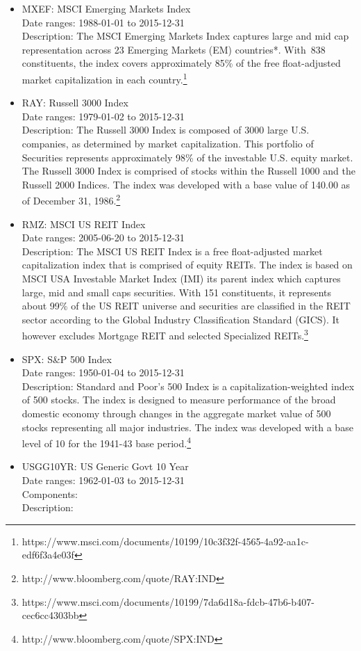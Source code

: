 \documentclass[12pt]{article}
\begin{document}
\begin{itemize}
Description: The MSCI EAFE Index is an equity index which captures large and mid cap representation across Developed Markets countries* around
the world, excluding the US and Canada. With 926 constituents, the index covers approximately 85\% of the free float-adjusted market
capitalization in each country.\footnote{https://www.msci.com/documents/10199/762896de-ebf3-49aa-89ec-e72c7592fd6b}
\item MXEF: MSCI Emerging Markets Index\\
Date ranges: 1988-01-01 to 2015-12-31 \\
Description: The MSCI Emerging Markets Index captures large and mid cap representation across 23 Emerging Markets (EM) countries*. With 838
constituents, the index covers approximately 85\% of the free float-adjusted market capitalization in each country.\footnote{https://www.msci.com/documents/10199/10c3f32f-4565-4a92-aa1c-edf6f3a4e03f}
\item RAY: Russell 3000 Index\\
Date ranges: 1979-01-02 to 2015-12-31 \\
Description: The Russell 3000 Index is composed of 3000 large U.S. companies, as determined by market capitalization. This portfolio of Securities represents approximately 98\% of the investable U.S. equity market. The Russell 3000 Index is comprised of stocks within the Russell 1000 and the Russell 2000 Indices. The index was developed with a base value of 140.00 as of December 31, 1986.\footnote{http://www.bloomberg.com/quote/RAY:IND}
\item RMZ: MSCI US REIT Index\\
Date ranges: 2005-06-20 to 2015-12-31 \\
Description: The MSCI US REIT Index is a free float-adjusted market capitalization index that is comprised of equity REITs. The index is based on MSCI
USA Investable Market Index (IMI) its parent index which captures large, mid and small caps securities. With 151 constituents, it represents
about 99\% of the US REIT universe and securities are classified in the REIT sector according to the Global Industry Classification Standard
(GICS). It however excludes Mortgage REIT and selected Specialized REITs.\footnote{https://www.msci.com/documents/10199/7da6d18a-fdcb-47b6-b407-cec6cc4303bb}
\item SPX: S\&P 500 Index\\
Date ranges: 1950-01-04 to 2015-12-31 \\
Description: Standard and Poor's 500 Index is a capitalization-weighted index of 500 stocks. The index is designed to measure performance of the broad domestic economy through changes in the aggregate market value of 500 stocks representing all major industries. The index was developed with a base level of 10 for the 1941-43 base period.\footnote{http://www.bloomberg.com/quote/SPX:IND}
\item USGG10YR: US Generic Govt 10 Year\\
Date ranges: 1962-01-03 to 2015-12-31 \\
Components: \\
Description: 
\end{itemize}
\end{document}

